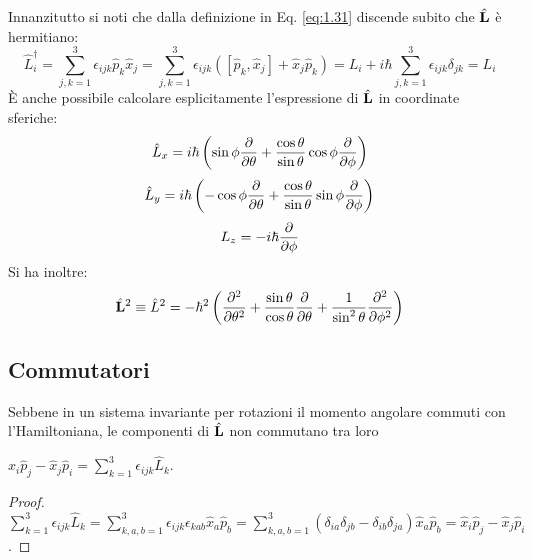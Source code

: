 Innanzitutto si noti che dalla definizione in Eq. \ref{eq:1.31} discende subito che $ \hat{\mathbf{L}} $ è hermitiano:
\begin{equation}
	\hat{L}_i^{\dagger} = \sum_{j,k = 1}^{3} \epsilon_{ijk} \hat{p}_k \hat{x}_j = \sum_{j,k = 1}^{3} \epsilon_{ijk} \left( [\hat{p}_k,\hat{x}_j] + \hat{x}_j \hat{p}_k \right) = L_i + i\hbar \sum_{j,k = 1}^{3} \epsilon_{ijk} \delta_{jk} = L_i
	\label{eq:2.6}
\end{equation}
È anche possibile calcolare esplicitamente l'espressione di $ \hat{\mathbf{L}} $ in coordinate sferiche:
\begin{equation}
	\hat{L}_x = i\hbar \left( \sin \phi \frac{\partial}{\partial \theta} + \frac{\cos \theta}{\sin \theta} \cos \phi \frac{\partial}{\partial \phi} \right)
	\label{eq:2.7}
\end{equation}
\begin{equation}
	\hat{L}_y = i\hbar \left( -\cos \phi \frac{\partial}{\partial \theta} + \frac{\cos \theta}{\sin \theta} \sin \phi \frac{\partial}{\partial \phi} \right)
	\label{eq:2.8}
\end{equation}
\begin{equation}
	L_z = -i\hbar \frac{\partial}{\partial \phi}
	\label{eq:2.9}
\end{equation}
Si ha inoltre:
\begin{equation}
	\hat{\mathbf{L}}^2 \equiv \hat{L}^2 = -\hbar^2 \left( \frac{\partial^2}{\partial \theta^2} + \frac{\sin \theta}{\cos \theta} \frac{\partial}{\partial \theta} + \frac{1}{\sin^2 \theta} \frac{\partial^2}{\partial \phi^2} \right)
	\label{eq:2.10}
\end{equation}

\subsection{Commutatori}

Sebbene in un sistema invariante per rotazioni il momento angolare commuti con l'Hamiltoniana, le componenti di $ \hat{\mathbf{L}} $ non commutano tra loro

\begin{lemma}\label{lem-l-comm}
	$ \hat{x}_i \hat{p}_j - \hat{x}_j \hat{p}_i = \sum_{k = 1}^{3} \epsilon_{ijk}	\hat{L}_k $.
\end{lemma}
\begin{proof}
	$ \sum_{k = 1}^{3} \epsilon_{ijk} \hat{L}_k = \sum_{k,a,b = 1}^{3} \epsilon_{ijk}\epsilon_{kab} \hat{x}_a \hat{p}_b = \sum_{k,a,b = 1}^{3} \left( \delta_{ia}\delta_{jb} - \delta_{ib}\delta_{ja} \right) \hat{x}_a \hat{p}_b = \hat{x}_i \hat{p}_j - \hat{x}_j \hat{p}_i $.
\end{proof}

